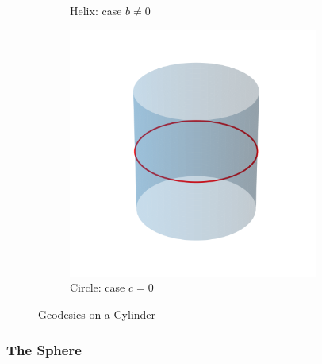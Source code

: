 \documentclass[12pt]{article}
\begin{document}
\begin{figure}[ht]
\begin{subfigure}[b]{0.3\linewidth}
	  \caption{Helix: case $b\neq 0$}
	  \label{subfig:helix}
	\end{subfigure}
	\hfill
	\begin{subfigure}[b]{0.3\linewidth}
	  \centering
	  \includegraphics[width=0.9\textwidth]{images/cylinder_circle.png}
	  \caption{Circle: case $c=0$}
	  \label{subfig:circle}
	\end{subfigure}
	\caption{Geodesics on a Cylinder}
	\label{fig:geodesics-on-cylinder}
\end{figure}
  
\subsubsection{The Sphere}
\end{document}
